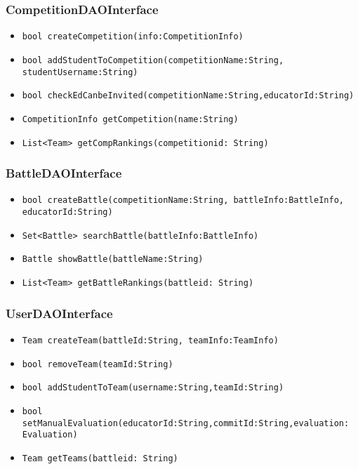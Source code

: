 \subsubsection{CompetitionDAOInterface}
\begin{itemize}
    \item \texttt{bool createCompetition(info:CompetitionInfo)}
    \item \texttt{bool addStudentToCompetition(competitionName:String, studentUsername:String)}
    \item \texttt{bool checkEdCanbeInvited(competitionName:String,educatorId:String)}
    \item \texttt{CompetitionInfo getCompetition(name:String)}
    \item \texttt{List<Team> getCompRankings(competitionid: String)}
\end{itemize}

\subsubsection{BattleDAOInterface}
\begin{itemize}
    \item \texttt{bool createBattle(competitionName:String, battleInfo:BattleInfo, educatorId:String)}
    \item \texttt{Set<Battle> searchBattle(battleInfo:BattleInfo)}
    \item \texttt{Battle showBattle(battleName:String)}
    \item \texttt{List<Team> getBattleRankings(battleid: String)}
\end{itemize}

\subsubsection{UserDAOInterface}
\begin{itemize}
    \item \texttt{Team createTeam(battleId:String, teamInfo:TeamInfo)}
    \item \texttt{bool removeTeam(teamId:String)}
    \item \texttt{bool addStudentToTeam(username:String,teamId:String)}
    \item \texttt{bool setManualEvaluation(educatorId:String,commitId:String,evaluation: Evaluation)}
    \item \texttt{Team getTeams(battleid: String)}
\end{itemize}


